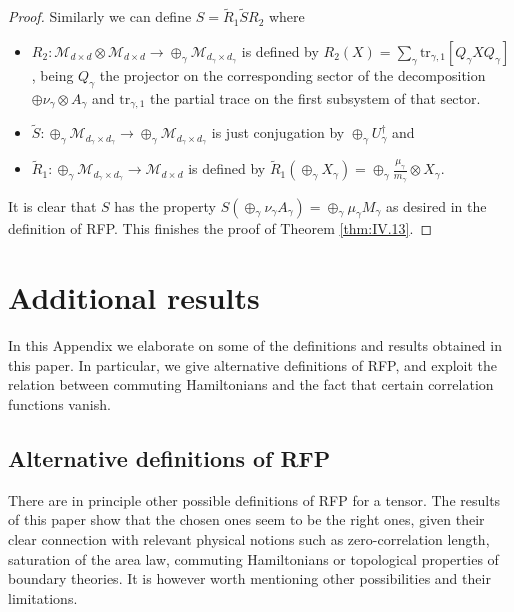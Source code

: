 \documentclass{elsarticle}
\newcommand{\tr}{\mathrm{tr}}
\begin{document}
\begin{proof}
 Similarly we can define $S=\tilde{R}_1\tilde{S} R_2$ where
 \begin{itemize}
 \item $R_2:\mathcal{M}_{d\times d}\otimes \mathcal{M}_{d\times d} \longrightarrow \oplus_\gamma\mathcal{M}_{d_\gamma\times d_\gamma}$
 is defined by  $R_2(X)=\sum_\gamma \tr_{\gamma,1}[Q_\gamma X Q_\gamma]$, being $Q_\gamma$ the projector on the corresponding sector of the decomposition $\oplus \nu_\gamma\otimes A_\gamma$ and $\tr_{\gamma,1}$ the partial trace on the first subsystem of that sector.
 \item $\tilde{S}:\oplus_\gamma\mathcal{M}_{d_\gamma\times d_\gamma}\longrightarrow \oplus_\gamma\mathcal{M}_{d_\gamma\times d_\gamma}$ is just conjugation by $\oplus_\gamma U_\gamma^\dagger$ and
 \item $\tilde{R}_1: \oplus_\gamma\mathcal{M}_{d_\gamma\times d_\gamma}\longrightarrow \mathcal{M}_{d\times d}$ is defined
  by
 $\tilde{R}_1(\oplus_\gamma X_\gamma)= \oplus_\gamma \frac{\mu_\gamma}{m_\gamma} \otimes X_\gamma$.
 \end{itemize}
 It is clear that $S$ has the property  $S(\oplus_\gamma \nu_\gamma A_\gamma)=\oplus_\gamma \mu_\gamma M_\gamma$ as desired in the definition of RFP.
This finishes the proof of Theorem \ref{thm:IV.13}.

 \end{proof}

\section{Additional results}\label{AppendixLooseEnds}

In this Appendix we elaborate on some of the definitions and results obtained in this paper. In particular, we give alternative definitions of RFP, and exploit the relation between commuting Hamiltonians and the fact that certain correlation functions vanish.

\subsection{Alternative definitions of RFP}

There are in principle other possible definitions of RFP for a tensor. The results of this paper show that the chosen ones seem to be the right ones, given their clear connection with relevant physical notions such as zero-correlation length, saturation of the area law, commuting Hamiltonians or topological properties of boundary theories. It is however worth mentioning other possibilities and their limitations.
\end{document}
